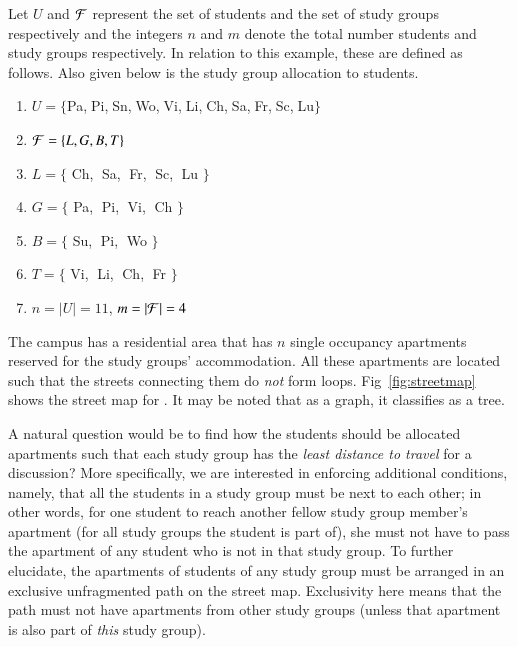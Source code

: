 \documentclass[MS,]{iitmdiss}
\begin{document}
Let $U$ and ${\cal F}$ represent the set of students and the set of study
groups respectively and the integers $n$ and $m$ denote the total
number students and study groups respectively. In relation to this
example, these are defined as follows. Also given below is the study group
allocation to students. 
\begin{enumerate}[]
\item {$U = \{$Pa,$\; $Pi,$\; $Sn,$\; $Wo,$\; $Vi,$\; $Li,$\; $Ch,$\;
    $Sa,$\; $Fr,$\; $Sc,$\; $Lu$\}$}
\item ${\cal F} = \{L, G, B, T\}$
\item $L = \{$ Ch,$\; $ Sa,$\; $ Fr,$\; $ Sc,$\; $ Lu $\}$
\item $G = \{$ Pa,$\; $ Pi,$\; $ Vi,$\; $ Ch $\}$
\item $B = \{$ Su,$\; $ Pi,$\; $ Wo $\}$
\item $T = \{$ Vi,$\; $ Li,$\; $ Ch,$\; $ Fr $\}$
\item $n = |U| = 11$, $m = |{\cal F}| = 4$
\end{enumerate}

The campus has a residential area {\residenceblock} that has $n$
single occupancy apartments reserved for the study groups'
accommodation.  All these apartments are located such that the streets
connecting them do {\em not} form loops. Fig~\ref{fig:streetmap} shows
the street map for {\residenceblock}. It may be noted that as a graph, it
classifies as a tree.


A natural question would be to find how the students should be
allocated apartments such that each study group has the {\em least
  distance to travel} for a discussion? More specifically, we are
interested in enforcing additional conditions, namely, that all the
students in a study group must be next to each other; in other words,
for one student to reach another fellow study group member's apartment
(for all study groups the student is part of), she must not have to
pass the apartment of any student who is not in that study group. To
further elucidate, the apartments of students of any study group must
be arranged in an exclusive unfragmented path on the street
map. Exclusivity here means that the path must not have apartments
from other study groups (unless that apartment is also part of {\em
  this} study group).
\end{document}
